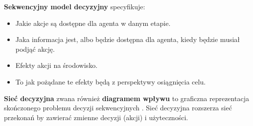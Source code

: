 \documentclass[a4paper, 12pt,oneside]{book}
\begin{document}
\textbf{Sekwencyjny model decyzyjny} specyfikuje:
\begin{itemize}
	\setlength\itemsep{-0.4em}
	\item Jakie akcje są dostępne dla agenta w danym etapie.
	\item Jaka informacja jest, albo będzie dostępna dla agenta, kiedy
		będzie musiał podjąć akcję.
	\item Efekty akcji na środowisko.
	\item To jak pożądane te efekty będą z perspektywy osiągnięcia celu.
\end{itemize}

\textbf{Sieć decyzyjna} zwana również \textbf{diagramem wpływu} to graficzna
reprezentacja skończonego problemu decyzji
sekwencyjnych \cite{ai_foundations_decision_networks}. Sieć decyzyjna
rozszerza sieć przekonań by zawierać zmienne decyzji (akcji) i użyteczności.
\end{document}
